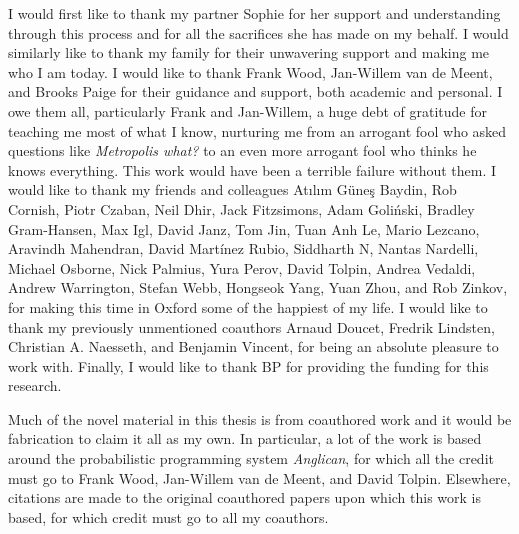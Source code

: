 
\vspace{20pt}
I would first like to thank my partner Sophie for her support and understanding through this
process and for all the sacrifices she has made on my behalf.  I would similarly like to
thank my family for their unwavering support and making me who I am today.  I would like
to thank Frank Wood, Jan-Willem van de Meent, and Brooks Paige for their guidance and
support, both academic and personal.  I owe them all, particularly Frank and Jan-Willem,
a huge debt of gratitude for teaching me most of what I know, nurturing me from an
arrogant fool who asked questions like \emph{Metropolis what?} to an even more arrogant
fool who thinks he knows everything.  This work would have been a terrible failure without them.
I would like to thank my friends and colleagues 
Atılım Güneş Baydin, Rob Cornish, Piotr Czaban, Neil Dhir, Jack Fitzsimons, Adam Goliński,
Bradley Gram-Hansen, Max Igl, David Janz, Tom Jin, Tuan Anh Le, Mario Lezcano, 
Aravindh Mahendran, David Martínez Rubio, Siddharth N, Nantas Nardelli, Michael Osborne,
Nick Palmius, Yura Perov, David Tolpin, Andrea Vedaldi, Andrew Warrington, Stefan Webb, 
Hongseok Yang, Yuan Zhou, and Rob Zinkov, for making this time in Oxford some of the 
happiest of my life.  I would like to thank my previously unmentioned coauthors Arnaud Doucet, Fredrik Lindsten,
Christian A. Naesseth, and Benjamin Vincent, for being an absolute pleasure to work with.
Finally, I would like to thank BP for providing the funding for this research.

Much of the novel material in this thesis is from coauthored work and it would be fabrication
to claim it all as my own.  In particular, a lot of the work is based around the probabilistic 
programming system \emph{Anglican}, for which all the credit must go to Frank Wood,
Jan-Willem van de Meent, and David Tolpin. Elsewhere, citations are made
to the original coauthored papers upon which this work is based, for which credit
must go to all my coauthors.